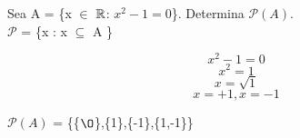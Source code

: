 \section{}
Sea A = \{x $\in$ $\mathbb{R}$: $x^{2} - 1 = 0$\}. Determina $\mathcal{P}(A)$.\\

$\mathcal{P}$ = \{x : x $\subseteq$ A \}

\[x^{2} - 1 = 0\]\[ x^{2} = 1 \]\[ x = \sqrt{1} \]\[ x = +1, x = -1 \]

$\mathcal{P}(A)$ = \{\{$\O$\},\{1\},\{-1\},\{1,-1\}\}